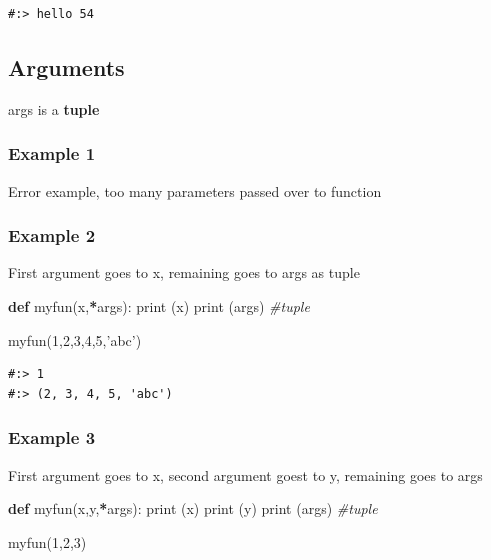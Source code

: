 \documentclass[
]{book}
\newenvironment{Shaded}{\begin{snugshade}}{\end{snugshade}}
\newcommand{\BuiltInTok}[1]{#1}
\newcommand{\CommentTok}[1]{\textcolor[rgb]{0.37,0.37,0.37}{\textit{#1}}}
\newcommand{\DecValTok}[1]{\textcolor[rgb]{0.06,0.06,0.06}{#1}}
\newcommand{\KeywordTok}[1]{\textcolor[rgb]{0.27,0.27,0.27}{\textbf{#1}}}
\newcommand{\NormalTok}[1]{#1}
\newcommand{\OperatorTok}[1]{\textcolor[rgb]{0.43,0.43,0.43}{\textbf{#1}}}
\newcommand{\StringTok}[1]{\textcolor[rgb]{0.5,0.5,0.5}{#1}}
\begin{document}
\begin{verbatim}
#:> hello 54
\end{verbatim}

\hypertarget{arguments}{%
\subsection{Arguments}\label{arguments}}

args is a \textbf{tuple}

\hypertarget{example-1}{%
\subsubsection{Example 1}\label{example-1}}

Error example, too many parameters passed over to function

\hypertarget{example-2}{%
\subsubsection{Example 2}\label{example-2}}

First argument goes to x, remaining goes to args as tuple

\begin{Shaded}
\begin{Highlighting}[]
\KeywordTok{def}\NormalTok{ myfun(x,}\OperatorTok{*}\NormalTok{args):}
    \BuiltInTok{print}\NormalTok{ (x)}
    \BuiltInTok{print}\NormalTok{ (args)     }\CommentTok{#tuple}
    
\NormalTok{myfun(}\DecValTok{1}\NormalTok{,}\DecValTok{2}\NormalTok{,}\DecValTok{3}\NormalTok{,}\DecValTok{4}\NormalTok{,}\DecValTok{5}\NormalTok{,}\StringTok{'abc'}\NormalTok{)}
\end{Highlighting}
\end{Shaded}

\begin{verbatim}
#:> 1
#:> (2, 3, 4, 5, 'abc')
\end{verbatim}

\hypertarget{example-3}{%
\subsubsection{Example 3}\label{example-3}}

First argument goes to x, second argument goest to y, remaining goes to args

\begin{Shaded}
\begin{Highlighting}[]
\KeywordTok{def}\NormalTok{ myfun(x,y,}\OperatorTok{*}\NormalTok{args):}
    \BuiltInTok{print}\NormalTok{ (x)}
    \BuiltInTok{print}\NormalTok{ (y)}
    \BuiltInTok{print}\NormalTok{ (args)     }\CommentTok{#tuple}
    
\NormalTok{myfun(}\DecValTok{1}\NormalTok{,}\DecValTok{2}\NormalTok{,}\DecValTok{3}\NormalTok{)}
\end{Highlighting}
\end{Shaded}
\end{document}
